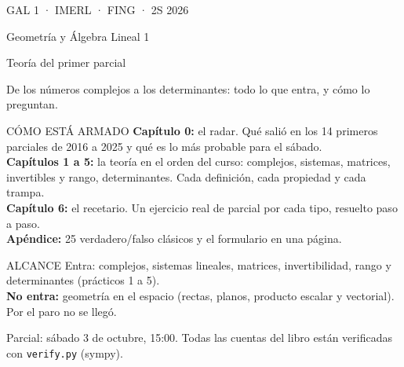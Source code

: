 \thispagestyle{empty}
\vspace*{18mm}
{\ttfamily\small\color{suave} GAL 1 · IMERL · FING · 2S 2026}\par\vspace{3mm}
{\plexbold\fontsize{24}{28}\selectfont Geometría y Álgebra Lineal 1}\par\vspace{1mm}
{\plexbold\fontsize{17}{21}\selectfont\color{rojo} Teoría del primer parcial}\par\vspace{4mm}
{\large De los números complejos a los determinantes: todo lo que entra, y cómo lo preguntan.}\par\vspace{9mm}
\begin{sello}{CÓMO ESTÁ ARMADO}
\textbf{Capítulo 0:} el radar. Qué salió en los 14 primeros parciales de 2016 a 2025 y qué es lo más probable para el sábado.\\[2pt]
\textbf{Capítulos 1 a 5:} la teoría en el orden del curso: complejos, sistemas, matrices, invertibles y rango, determinantes. Cada definición, cada propiedad y cada trampa.\\[2pt]
\textbf{Capítulo 6:} el recetario. Un ejercicio real de parcial por cada tipo, resuelto paso a paso.\\[2pt]
\textbf{Apéndice:} 25 verdadero/falso clásicos y el formulario en una página.
\end{sello}
\begin{memo}{ALCANCE}
Entra: complejos, sistemas lineales, matrices, invertibilidad, rango y determinantes (prácticos 1 a 5).\\
\textbf{No entra:} geometría en el espacio (rectas, planos, producto escalar y vectorial). Por el paro no se llegó.
\end{memo}
\vfill
{\small\color{suave} Parcial: sábado 3 de octubre, 15:00. Todas las cuentas del libro están verificadas con \texttt{verify.py} (sympy).\par}
\newpage

